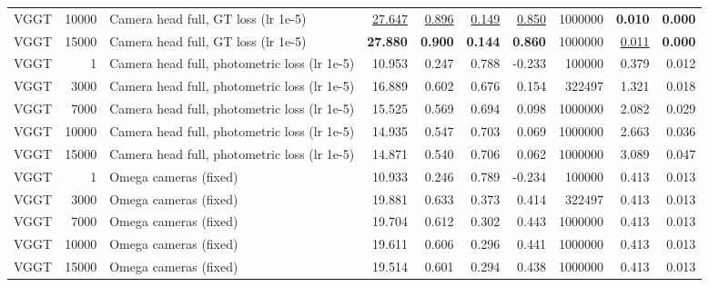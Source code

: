 \begin{table}[H]
\begin{tabular}{lrlrrrrrrr}
VGGT & 10000 & Camera head full, GT loss (lr 1e-5) & \underline{27.647} & \underline{0.896} & \underline{0.149} & \underline{0.850} & 1000000 & \textbf{0.010} & \textbf{0.000} \\
VGGT & 15000 & Camera head full, GT loss (lr 1e-5) & \textbf{27.880} & \textbf{0.900} & \textbf{0.144} & \textbf{0.860} & 1000000 & \underline{0.011} & \textbf{0.000} \\
VGGT & 1 & Camera head full, photometric loss (lr 1e-5) & 10.953 & 0.247 & 0.788 & -0.233 & 100000 & 0.379 & 0.012 \\
VGGT & 3000 & Camera head full, photometric loss (lr 1e-5) & 16.889 & 0.602 & 0.676 & 0.154 & 322497 & 1.321 & 0.018 \\
VGGT & 7000 & Camera head full, photometric loss (lr 1e-5) & 15.525 & 0.569 & 0.694 & 0.098 & 1000000 & 2.082 & 0.029 \\
VGGT & 10000 & Camera head full, photometric loss (lr 1e-5) & 14.935 & 0.547 & 0.703 & 0.069 & 1000000 & 2.663 & 0.036 \\
VGGT & 15000 & Camera head full, photometric loss (lr 1e-5) & 14.871 & 0.540 & 0.706 & 0.062 & 1000000 & 3.089 & 0.047 \\
VGGT & 1 & Omega cameras (fixed) & 10.933 & 0.246 & 0.789 & -0.234 & 100000 & 0.413 & 0.013 \\
VGGT & 3000 & Omega cameras (fixed) & 19.881 & 0.633 & 0.373 & 0.414 & 322497 & 0.413 & 0.013 \\
VGGT & 7000 & Omega cameras (fixed) & 19.704 & 0.612 & 0.302 & 0.443 & 1000000 & 0.413 & 0.013 \\
VGGT & 10000 & Omega cameras (fixed) & 19.611 & 0.606 & 0.296 & 0.441 & 1000000 & 0.413 & 0.013 \\
VGGT & 15000 & Omega cameras (fixed) & 19.514 & 0.601 & 0.294 & 0.438 & 1000000 & 0.413 & 0.013 \\
\bottomrule
\end{tabular}
\end{table}